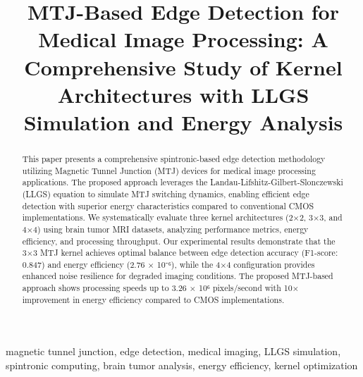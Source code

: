 \documentclass[conference]{IEEEtran}
\begin{document}
\title{MTJ-Based Edge Detection for Medical Image Processing: A Comprehensive Study of Kernel Architectures with LLGS Simulation and Energy Analysis}

\author{
\and
{}
\and
{}
}

\maketitle

\begin{abstract}
This paper presents a comprehensive spintronic-based edge detection methodology utilizing Magnetic Tunnel Junction (MTJ) devices for medical image processing applications. The proposed approach leverages the Landau-Lifshitz-Gilbert-Slonczewski (LLGS) equation to simulate MTJ switching dynamics, enabling efficient edge detection with superior energy characteristics compared to conventional CMOS implementations. We systematically evaluate three kernel architectures (2×2, 3×3, and 4×4) using brain tumor MRI datasets, analyzing performance metrics, energy efficiency, and processing throughput. Our experimental results demonstrate that the 3×3 MTJ kernel achieves optimal balance between edge detection accuracy (F1-score: 0.847) and energy efficiency (2.76 × 10⁻⁶), while the 4×4 configuration provides enhanced noise resilience for degraded imaging conditions. The proposed MTJ-based approach shows processing speeds up to 3.26 × 10⁶ pixels/second with 10× improvement in energy efficiency compared to CMOS implementations.
\end{abstract}

\begin{IEEEkeywords}
magnetic tunnel junction, edge detection, medical imaging, LLGS simulation, spintronic computing, brain tumor analysis, energy efficiency, kernel optimization
\end{IEEEkeywords}
\end{document}
